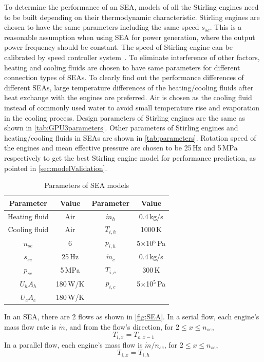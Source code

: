To determine the performance of an SEA, models of all the Stirling engines need to be built depending on their thermodynamic characteristic. Stirling engines are chosen to have the same parameters including the same speed $s_{se}$. This is a reasonable assumption when using SEA for power generation, where the output power frequency should be constant. The speed of Stirling engine can be calibrated by speed controller system~\cite{Hooshang2016}. To eliminate interference of other factors, heating and cooling fluids are chosen to have same parameters for different connection types of SEAs. To clearly find out the performance differences of different SEAs, large temperature differences of the heating/cooling fluids after heat exchange with the engines are preferred. Air is chosen as the cooling fluid instead of commonly used water to avoid small temperature rise and evaporation in the cooling process. Design parameters of Stirling engines are the same as shown in \autoref{tab:GPU3parameters}. Other parameters of Stirling engines and heating/cooling fluids in SEAs are shown in \autoref{tab:parameters}. Rotation speed of the engines and mean effective pressure are chosen to be 25$\,\mathrm{Hz}$ and 5$\,\mathrm{MPa}$ respectively to get the best Stirling engine model for performance prediction, as pointed in \autoref{sec:modelValidation}.

\begin{table}[htbp]
	\caption{Parameters of SEA models}
	\centering
	\begin{tabular}{cccc}
		\toprule
		Parameter		&	Value	& Parameter	&	Value\\
		\midrule
		Heating fluid	&	Air		&	$\dot{m}_h$	&	0.4\,kg/s\\
		Cooling fluid	&	Air	&	$T_{i,h}$	&	1000\,K\\
		$n_{se}$	&	6	&	$p_{i,h}$	&	5$\times$10$^5$\,Pa\\
		$s_{se}$	&	25\,Hz	&	$\dot{m}_c$	&	0.4\,kg/s\\
		$p_{se}$		&	5\,MPa	&	$T_{i,c}$	&	300\,K\\
		$U_hA_h$	&	180\,W/K	&	$p_{i,c}$	&	5$\times$10$^5$\,Pa\\
		$U_cA_c$		&	180\,W/K	&&\\
		\bottomrule
	\end{tabular}
	
	\label{tab:parameters}
\end{table}

In an SEA, there are 2 flows as shown in \autoref{fig:SEA}. In a serial flow, each engine's mass flow rate is $\dot{m}$, and from the flow's direction, for $2\leqslant{}x\leqslant{}n_{se}$, 
\begin{equation}
	T_{i,x} = T_{o,x-1}
	\label{Eq:T_serial}
\end{equation}
In a parallel flow, each engine's mass flow is $\dot{m}/n_{se}$, for $2\leqslant{}x\leqslant{}n_{se}$,
\begin{equation}
	T_{i,x} = T_{i,h}
	\label{Eq:T_parallel}
\end{equation}

